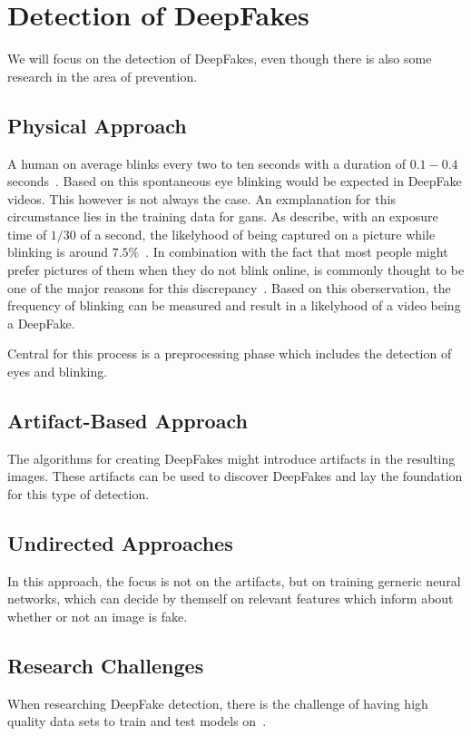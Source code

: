 \section{Detection of DeepFakes}
We will focus on the detection of DeepFakes, even though there is also some research in the area of
prevention.

\subsection{Physical Approach}
A human on average blinks every two to ten seconds with a duration of \(0.1-0.4\) seconds~\cite{li_ictu_2018}.
Based on this spontaneous eye blinking would be expected in DeepFake videos.
This however is not always the case.
An exmplanation for this circumstance lies in the training data for \gls{gan}s.
As \textcite{li_ictu_2018} describe, with an exposure time of \(1/30\) of a second,
the likelyhood of being captured on a picture while blinking is around \(7.5\%\)~\cite{li_ictu_2018}.
In combination with the fact that most people might prefer pictures of them when they do not blink online,
is commonly thought to be one of the major reasons for this discrepancy~\cite{pishori_detecting_2020}.
Based on this oberservation, the frequency of blinking can be measured and result in a likelyhood of
a video being a DeepFake.

Central for this process is a preprocessing phase which includes the detection of eyes and blinking.



\subsection{Artifact-Based Approach}
The algorithms for creating DeepFakes might introduce artifacts in the resulting images.
These artifacts can be used to discover DeepFakes and lay the foundation for this type of detection.

\subsection{Undirected Approaches}
In this approach, the focus is not on the artifacts, but on training gerneric neural networks, which can decide by themself on relevant
features which inform about whether or not an image is fake.

\subsection{Research Challenges}
When researching DeepFake detection, there is the challenge of having high quality data sets to train and test models on~\cite{li_celeb-df_2019}.
